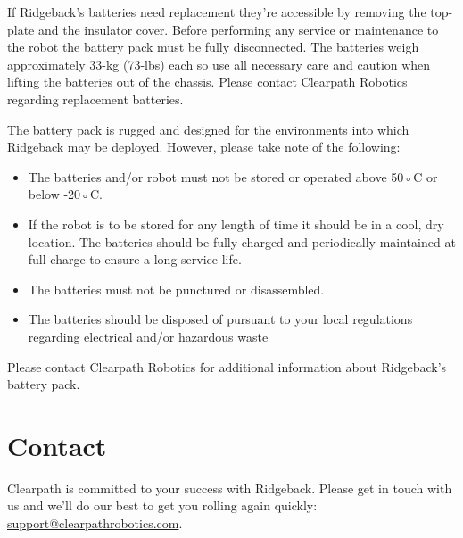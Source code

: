 \documentclass[]{clearpath-latex/clearpath-manual}
\begin{document}
If Ridgeback's batteries need replacement they're accessible by removing the top-plate and the insulator cover. Before performing any service or maintenance to the robot the battery pack must be fully disconnected. The batteries weigh approximately 33-kg (73-lbs) each so use all necessary care and caution when lifting the batteries out of the chassis. Please contact Clearpath Robotics regarding replacement batteries.

The battery pack is rugged and designed for the environments into which Ridgeback may be deployed. However, please take note of the following:

\begin{itemize}[nolistsep]
	\item The batteries and/or robot must not be stored or operated above 50◦C or below -20◦C.
	\item If the robot is to be stored for any length of time it should be in a cool, dry location. The batteries should be fully charged and periodically maintained at full charge to ensure a long service life.
	\item The batteries must not be punctured or disassembled.
	\item The batteries should be disposed of pursuant to your local regulations regarding electrical and/or hazardous waste
\end{itemize}

Please contact Clearpath Robotics for additional information about Ridgeback's battery pack.


%
%
%
%
%

\section{Contact}
\label{contact}

Clearpath is committed to your success with Ridgeback. Please get in touch with us and we’ll do our best to get
you rolling again quickly: \url{support@clearpathrobotics.com}.
\end{document}
